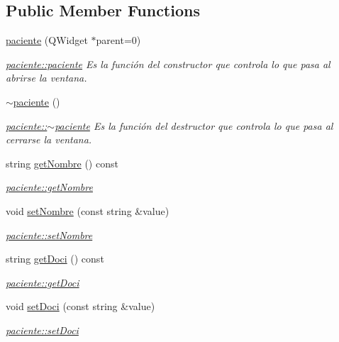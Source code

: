 \subsection*{Public Member Functions}
\begin{DoxyCompactItemize}
\item 
\hyperlink{classpaciente_ad0ccef0b1f9db88970e6c748988cdf68}{paciente} (Q\+Widget $\ast$parent=0)
\begin{DoxyCompactList}\small\item\em \hyperlink{classpaciente_ad0ccef0b1f9db88970e6c748988cdf68}{paciente\+::paciente} Es la función del constructor que controla lo que pasa al abrirse la ventana. \end{DoxyCompactList}\item 
\hyperlink{classpaciente_aa2c0443ac761e3c01437ec3b051b1e5a}{$\sim$paciente} ()
\begin{DoxyCompactList}\small\item\em \hyperlink{classpaciente_aa2c0443ac761e3c01437ec3b051b1e5a}{paciente\+::$\sim$paciente} Es la función del destructor que controla lo que pasa al cerrarse la ventana. \end{DoxyCompactList}\item 
string \hyperlink{classpaciente_ade5b611666a067d54d8cee91bf737f2a}{get\+Nombre} () const
\begin{DoxyCompactList}\small\item\em \hyperlink{classpaciente_ade5b611666a067d54d8cee91bf737f2a}{paciente\+::get\+Nombre} \end{DoxyCompactList}\item 
void \hyperlink{classpaciente_aa1c002ee279da1512c06a30ab6f36cf8}{set\+Nombre} (const string \&value)
\begin{DoxyCompactList}\small\item\em \hyperlink{classpaciente_aa1c002ee279da1512c06a30ab6f36cf8}{paciente\+::set\+Nombre} \end{DoxyCompactList}\item 
string \hyperlink{classpaciente_a35eb76c2a62bf5942a81f3ab0dfa7ae6}{get\+Doci} () const
\begin{DoxyCompactList}\small\item\em \hyperlink{classpaciente_a35eb76c2a62bf5942a81f3ab0dfa7ae6}{paciente\+::get\+Doci} \end{DoxyCompactList}\item 
void \hyperlink{classpaciente_a98b1eb1d2344fde9ea082722eecd980a}{set\+Doci} (const string \&value)
\begin{DoxyCompactList}\small\item\em \hyperlink{classpaciente_a98b1eb1d2344fde9ea082722eecd980a}{paciente\+::set\+Doci} \end{DoxyCompactList}\end{DoxyCompactItemize}



